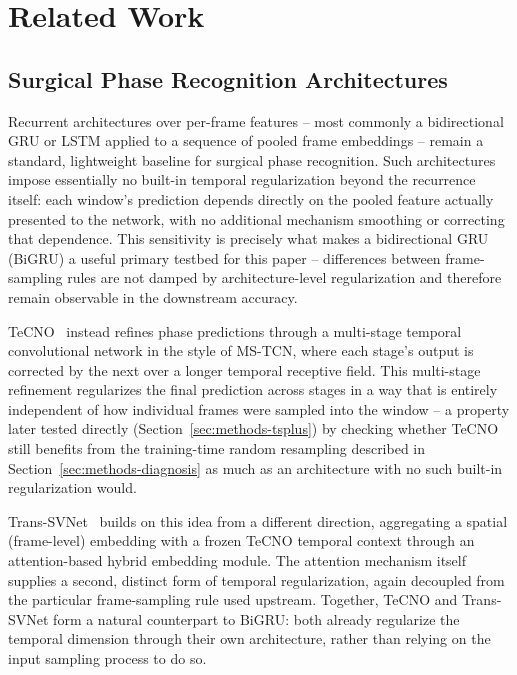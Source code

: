 \documentclass[preprint,12pt]{elsarticle}
\begin{document}
\section{Related Work}
\label{sec:related}

\subsection{Surgical Phase Recognition Architectures}
\label{sec:related-arch}

Recurrent architectures over per-frame features -- most commonly a bidirectional GRU or LSTM applied to a sequence of pooled frame embeddings -- remain a standard, lightweight baseline for surgical phase recognition. Such architectures impose essentially no built-in temporal regularization beyond the recurrence itself: each window's prediction depends directly on the pooled feature actually presented to the network, with no additional mechanism smoothing or correcting that dependence. This sensitivity is precisely what makes a bidirectional GRU (BiGRU) a useful primary testbed for this paper -- differences between frame-sampling rules are not damped by architecture-level regularization and therefore remain observable in the downstream accuracy.

TeCNO~\cite{czempiel2020tecno} instead refines phase predictions through a multi-stage temporal convolutional network in the style of MS-TCN, where each stage's output is corrected by the next over a longer temporal receptive field. This multi-stage refinement regularizes the final prediction across stages in a way that is entirely independent of how individual frames were sampled into the window -- a property later tested directly (Section~\ref{sec:methods-tsplus}) by checking whether TeCNO still benefits from the training-time random resampling described in Section~\ref{sec:methods-diagnosis} as much as an architecture with no such built-in regularization would.

Trans-SVNet~\cite{gao2021transsvnet} builds on this idea from a different direction, aggregating a spatial (frame-level) embedding with a frozen TeCNO temporal context through an attention-based hybrid embedding module. The attention mechanism itself supplies a second, distinct form of temporal regularization, again decoupled from the particular frame-sampling rule used upstream. Together, TeCNO and Trans-SVNet form a natural counterpart to BiGRU: both already regularize the temporal dimension through their own architecture, rather than relying on the input sampling process to do so.
\end{document}
